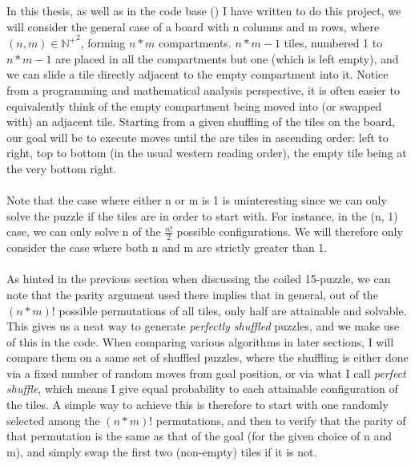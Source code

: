 In this thesis, as well as in the code base (\cite{FB}) I have written to do this project, we will consider the general case of a board with n columns and m rows, where $(n, m) \in {\mathbb{N}^{+}}^{2}$, forming $n * m$ compartments. $n * m - 1$ tiles, numbered 1 to $n * m - 1$ are placed in all the compartments but one (which is left empty), and we can slide a tile directly adjacent to the empty compartment into it. Notice from a programming and mathematical analysis perspective, it is often easier to equivalently think of the empty compartment being moved into (or swapped with) an adjacent tile. Starting from a given shuffling of the tiles on the board, our goal will be to execute moves until the are tiles in ascending order: left to right, top to bottom (in the usual western reading order), the empty tile being at the very bottom right.
\\
\\
Note that the case where either n or m is 1 is uninteresting since we can only solve the puzzle if the tiles are in order to start with. For instance, in the (n, 1) case, we can only solve n of the $\frac{n!}{2}$ possible configurations. We will therefore only consider the case where both n and m are strictly greater than 1.
\\
\\
As hinted in the previous section when discussing the coiled 15-puzzle, we can note that the parity argument used there implies that in general, out of the $(n * m)!$ possible permutations of all tiles, only half are attainable and solvable. This gives us a neat way to generate \textit{perfectly shuffled} puzzles, and we make use of this in the code. When comparing various algorithms in later sections, I will compare them on a same set of shuffled puzzles, where the shuffling is either done via a fixed number of random moves from goal position, or via what I call \textit{perfect shuffle}, which means I give equal probability to each attainable configuration of the tiles. A simple way to achieve this is therefore to start with one randomly selected among the $(n * m)!$ permutations, and then to verify that the parity of that permutation is the same as that of the goal (for the given choice of n and m), and simply swap the first two (non-empty) tiles if it is not.





